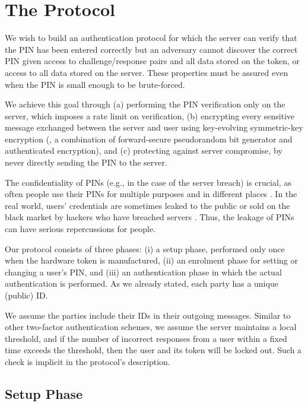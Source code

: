 
\section{The Protocol}\label{sec::the-protocol}

We wish to build an authentication protocol for which the server can verify that the PIN has been entered correctly but an adversary cannot discover the correct PIN given access to challenge/response pairs and all data stored on the token, or access to all data stored on the server. 
These properties must be assured even when the PIN is small enough to be brute-forced.

We achieve this goal through (a) performing the PIN verification only on the server, which imposes a rate limit on verification, (b) encrypting every sensitive message exchanged between the server and user using key-evolving symmetric-key encryption (\ie, a combination of forward-secure pseudorandom bit generator and authenticated encryption), and (c) protecting against server compromise, by never directly sending the PIN to the server. 

The confidentiality of PINs (e.g., in the case of the server breach) is crucial, as often people use their PINs for multiple purposes and in different places \cite{MurdochBAABHSS16}.  In the real world, users' credentials are sometimes leaked to the public or sold on the black market by hackers who have breached servers \cite{ThomasPYRKIBPPB19}. Thus, the leakage of PINs can have serious repercussions for people.   


Our protocol consists of three phases: (i) a setup phase, performed only once when the hardware token is manufactured, (ii) an enrolment phase for setting or changing a user's PIN, and (iii) an authentication phase in which the actual authentication is performed. As we already stated, each party has a unique (public) ID. 

We assume the parties include their IDs in their outgoing messages.  Similar to other two-factor authentication schemes, we assume the server maintains a local threshold, and if the number of incorrect responses from a user within a fixed time exceeds the threshold, then the user and its token will be locked out. Such a check is implicit in the protocol's description. 




\subsection{Setup Phase}
\label{sec:setup}

